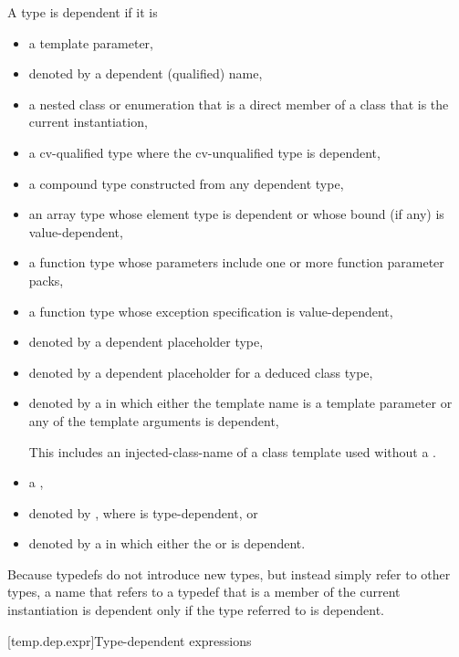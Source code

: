 \pnum
A type is dependent if it is
\begin{itemize}
\item
a template parameter,
\item
denoted by a dependent (qualified) name,
\item
a nested class or enumeration that is a direct member of
a class that is the current instantiation,
\item
a cv-qualified type where the cv-unqualified type is dependent,
\item
a compound type constructed from any dependent type,
\item
an array type whose element type is dependent or whose
bound (if any) is value-dependent,
\item
a function type whose parameters include one or more function parameter packs,
\item
a function type whose exception specification is value-dependent,
\item
denoted by a dependent placeholder type,
\item
denoted by a dependent placeholder for a deduced class type,
\item
denoted by a 
in which either the template name is a template parameter or any of the
template arguments is dependent,
\begin{footnote}
This includes an injected-class-name of a class template
used without a .
\end{footnote}
\item a ,
\item denoted by \tcode{)},
where  is type-dependent, or
\item denoted by a  in which either
the  or
is dependent.
\end{itemize}

\pnum
\begin{note}
Because typedefs do not introduce new types, but
instead simply refer to other types, a name that refers to a
typedef that is a member of the current instantiation is dependent
only if the type referred to is dependent.
\end{note}

[temp.dep.expr]{Type-dependent expressions}

